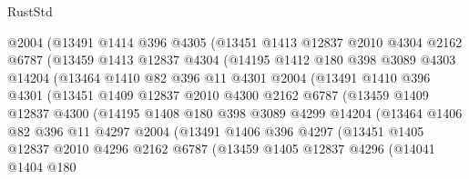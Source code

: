 \begin{lexlean}{RustStd}
\begin{coremodule}
{\begin{coremodule}
{{{{{{{{{{{{{{{{{{{{{{{{{{{{{{{              @2004
              (@13491
                @1414
                @396
                @4305
                (@13451
                  @1413
                  @12837
                  @2010
                  @4304
                  @2162
                  @6787
                  (@13459
                    @1413
                    @12837
                    @4304
                    (@14195
                      @1412
                      @180
                      @398
                      @3089
                      @4303
                      @14204
                      (@13464
                        @1410
                        @82
                        @396
                        @11
                        @4301
                        @2004
                        (@13491
                          @1410
                          @396
                          @4301
                          (@13451
                            @1409
                            @12837
                            @2010
                            @4300
                            @2162
                            @6787
                            (@13459
                              @1409
                              @12837
                              @4300
                              (@14195
                                @1408
                                @180
                                @398
                                @3089
                                @4299
                                @14204
                                (@13464
                                  @1406
                                  @82
                                  @396
                                  @11
                                  @4297
                                  @2004
                                  (@13491
                                    @1406
                                    @396
                                    @4297
                                    (@13451
                                      @1405
                                      @12837
                                      @2010
                                      @4296
                                      @2162
                                      @6787
                                      (@13459
                                        @1405
                                        @12837
                                        @4296
                                        (@14041
                                          @1404
                                          @180
}}}}}}}}}}}}}}}}}}}}}}}}}}}}}}}
\end{coremodule}}
\end{coremodule}
\end{lexlean}

